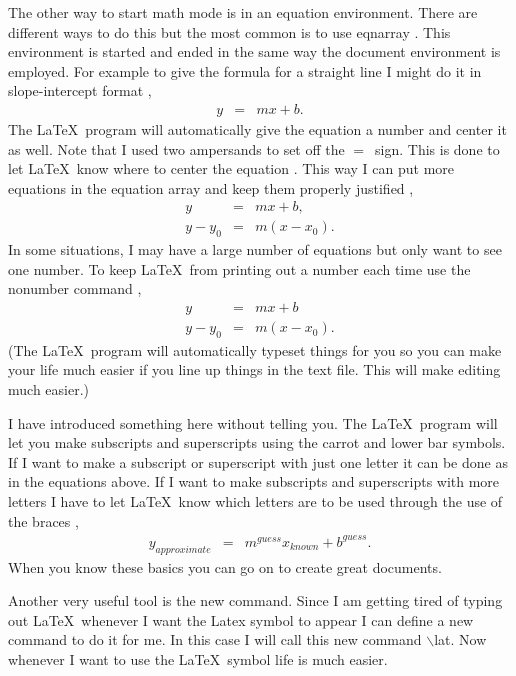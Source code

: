 The other way to start math mode is in an equation environment.  There
are different ways to do this but the most common is to use eqnarray
\cite{The-Manual}.  This environment is started and ended in the same way
the document environment is employed.  For example to give the formula
for a straight line I might do it in slope-intercept format
\cite[p. 8]{thomas},
\begin{eqnarray}
y & = & mx + b.
\end{eqnarray}
The \LaTeX\ program will automatically give the equation a number
and center it as well.  Note that I used two ampersands to set off the
$=$\ sign.  This is done to let \LaTeX\ know where to center the
equation \cite{The-Manual}.  This way I can put more equations in the
equation array and keep them properly justified \cite[p. 7]{thomas},
\begin{eqnarray}
y & = & mx + b, \\
y - y_0 & = & m (x - x_0).
\end{eqnarray}
In some situations, I may have a large number of equations but
only want to see one number.  To keep \LaTeX\ from printing out
a number each time use the nonumber command \cite{The-Manual},
\begin{eqnarray}
y       & = & mx + b \\
y - y_0 & = & m (x - x_0). \nonumber
\end{eqnarray}
(The \LaTeX\ program will automatically typeset things for you so 
you can make your life much easier if you line up things in the
text file.  This will make editing much easier.)

I have introduced something here without telling you.  The \LaTeX\ 
program will let you make subscripts and superscripts using the 
carrot and lower bar symbols.  If I want to make a subscript or superscript
with just one letter it can be done as in the equations above.
If I want to make subscripts and superscripts with more letters I
have to let \LaTeX\ know which letters are to be used through the
use of the braces \cite{The-Manual},
\begin{eqnarray}
y_{approximate} & = & m^{guess} x_{known} + b^{guess}.
\end{eqnarray}
When you know these basics you can go on to create great documents.


Another very useful tool is the new command.  Since I am getting
tired of typing out \LaTeX\ whenever I want the Latex symbol
to appear I can define a new command to do it for me.  In this
case I will call this new command $\backslash$lat.
\newcommand{\lat}{\LaTeX} 
Now whenever I want to use the \lat\ symbol life is much easier.


